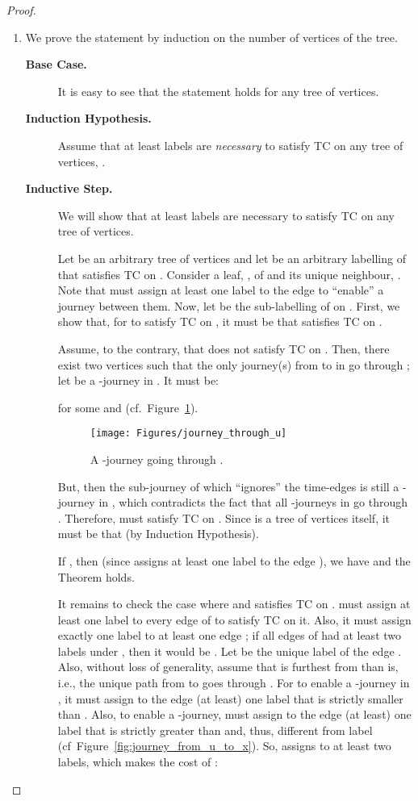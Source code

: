 \documentclass[a4paper,UKenglish]{article}
\begin{document}
\begin{proof}
\begin{enumerate}[label=(\alph*)]

\item\label{item:tree_lower_bound} We prove the statement by induction on the number of vertices of the tree.
\begin{description}
\item[\textbf{Base Case.}] \noindent It is easy to see that the statement holds for any tree of  vertices.

\item[\textbf{Induction Hypothesis.}] \noindent Assume that at least  labels are \emph{necessary} to satisfy TC on any tree of  vertices, .

\item[\textbf{Inductive Step.}] \noindent We will show that at least  labels are necessary to satisfy TC on any tree of  vertices.

Let  be an arbitrary tree of  vertices and let  be an arbitrary labelling of  that satisfies TC on . Consider a leaf, , of  and its unique neighbour, . Note that  must assign at least one label to the edge  to ``enable'' a journey between them. Now, let  be the sub-labelling of  on . First, we show that, for  to satisfy TC on , it must be that  satisfies TC on .

Assume, to the contrary, that  does not satisfy TC on . Then, there exist two vertices  such that the only journey(s) from  to  in  go through ; let  be a -journey in . It must be:

for some  and  (cf.~Figure~\ref{fig:journey_through_u}).
\begin{figure}[!htb]
\centering
\texttt{[image: Figures/journey\_through\_u]}
\caption{A -journey going through .}
\label{fig:journey_through_u}
\end{figure}

But, then the sub-journey of  which ``ignores'' the time-edges  is still a -journey in , which contradicts the fact that all -journeys in  go through . Therefore,  must satisfy TC on . Since  is a tree of  vertices itself, it must be that  (by Induction Hypothesis).

If , then (since  assigns at least one label to the edge ), we have  and the Theorem holds.

It remains to check the case where  and  satisfies TC on .  must assign at least one label to every edge of  to satisfy TC on it. Also, it must assign exactly one label to at least one edge ; if all edges of  had at least two labels under , then it would be . Let  be the unique label of the edge . Also, without loss of generality, assume that  is furthest from  than  is, i.e., the unique path from  to  goes through . For  to enable a -journey in , it must assign to the edge  (at least) one label  that is strictly smaller than . Also, to enable a -journey,  must assign to the edge  (at least) one label  that is strictly greater than  and, thus, different from label  (cf~Figure~\ref{fig:journey_from_u_to_x}). So,  assigns to  at least two labels, which makes the cost of :



\end{description}
\end{enumerate}
\end{proof}
\end{document}
